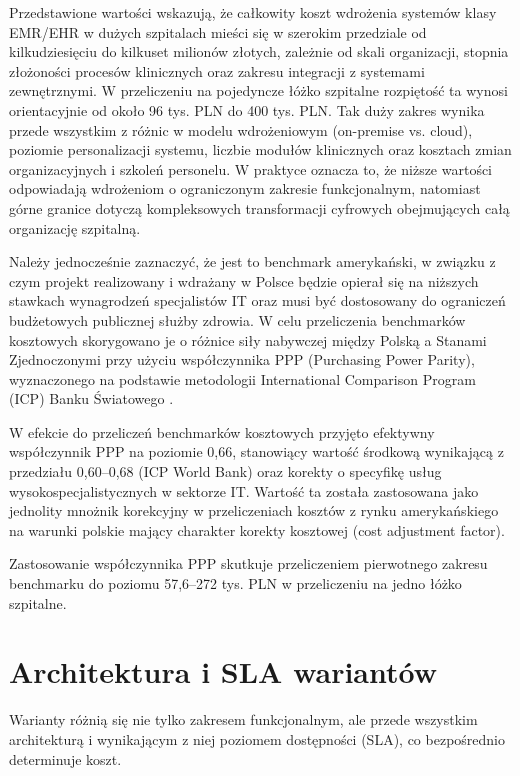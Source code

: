 Przedstawione wartości wskazują, że całkowity koszt wdrożenia systemów klasy EMR/EHR w dużych szpitalach mieści się w szerokim przedziale od kilkudziesięciu do kilkuset milionów złotych, zależnie od skali organizacji, stopnia złożoności procesów klinicznych oraz zakresu integracji z systemami zewnętrznymi. W przeliczeniu na pojedyncze łóżko szpitalne rozpiętość ta wynosi orientacyjnie od około 96 tys. PLN do 400 tys. PLN. Tak duży zakres wynika przede wszystkim z różnic w modelu wdrożeniowym (on-premise vs. cloud), poziomie personalizacji systemu, liczbie modułów klinicznych oraz kosztach zmian organizacyjnych i szkoleń personelu. W praktyce oznacza to, że niższe wartości odpowiadają wdrożeniom o ograniczonym zakresie funkcjonalnym, natomiast górne granice dotyczą kompleksowych transformacji cyfrowych obejmujących całą organizację szpitalną. 

Należy jednocześnie zaznaczyć, że jest to benchmark amerykański, w związku z czym projekt realizowany i wdrażany w Polsce będzie opierał się na niższych stawkach wynagrodzeń specjalistów IT oraz musi być dostosowany do ograniczeń budżetowych publicznej służby zdrowia. W celu przeliczenia benchmarków kosztowych skorygowano je o różnice siły nabywczej między Polską a Stanami Zjednoczonymi przy użyciu współczynnika PPP (Purchasing Power Parity), wyznaczonego na podstawie metodologii International Comparison Program (ICP) Banku Światowego \cite{WorldBank_ICP_Methodology}.

W efekcie do przeliczeń benchmarków kosztowych przyjęto efektywny współczynnik PPP na poziomie 0{,}66, stanowiący wartość środkową wynikającą z przedziału 0{,}60--0{,}68 (ICP World Bank) oraz korekty o specyfikę usług wysokospecjalistycznych w sektorze IT. Wartość ta została zastosowana jako jednolity mnożnik korekcyjny w przeliczeniach kosztów z rynku amerykańskiego na warunki polskie mający charakter korekty kosztowej (cost adjustment factor).

Zastosowanie współczynnika PPP skutkuje przeliczeniem pierwotnego zakresu benchmarku do poziomu 57,6–272 tys. PLN w przeliczeniu na jedno łóżko szpitalne.

\section{Architektura i SLA wariantów}

Warianty różnią się nie tylko zakresem funkcjonalnym, ale przede wszystkim architekturą i wynikającym z niej poziomem dostępności (SLA), co bezpośrednio determinuje koszt.

